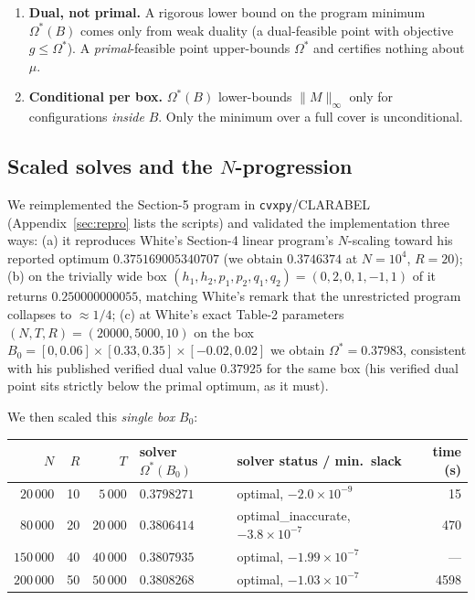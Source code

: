 \documentclass[11pt]{article}
\theoremstyle{remark}
\newcommand{\supnorm}[1]{\lVert #1 \rVert_\infty}
\begin{document}
\begin{enumerate}
\item[(L1)] \textbf{Dual, not primal.} A rigorous lower bound on the program
minimum $\Omega^\ast(B)$ comes only from weak duality (a dual-feasible point
with objective $g \le \Omega^\ast$). A \emph{primal}-feasible point
upper-bounds $\Omega^\ast$ and certifies nothing about $\mu$.
\item[(L2)] \textbf{Conditional per box.} $\Omega^\ast(B)$ lower-bounds
$\supnorm{M}$ only for configurations \emph{inside} $B$. Only the minimum
over a full cover is unconditional.
\end{enumerate}

\subsection{Scaled solves and the $N$-progression}\label{sec:scaling}

We reimplemented the Section-5 program in \texttt{cvxpy}/CLARABEL
(Appendix~\ref{sec:repro} lists the scripts) and validated the
implementation three ways: (a) it reproduces White's Section-4 linear
program's $N$-scaling toward his reported optimum $0.375169005340707$
(we obtain $0.3746374$ at $N = 10^4$, $R=20$); (b) on the trivially wide box
$(h_1,h_2,p_1,p_2,q_1,q_2)=(0,2,0,1,-1,1)$ of \cite[eq.~(5.15)]{White22} it
returns $0.250000000055$, matching White's remark that the unrestricted
program collapses to $\approx 1/4$; (c) at White's exact Table-2 parameters
$(N,T,R) = (20000, 5000, 10)$ on the box
$B_0 = [0, 0.06] \times [0.33, 0.35] \times [-0.02, 0.02]$ we obtain
$\Omega^\ast = 0.37983$, consistent with his published verified dual value
$0.37925$ for the same box (his verified dual point sits strictly below the
primal optimum, as it must).

We then scaled this \emph{single box} $B_0$:

\begin{center}
\begin{tabular}{@{}rrrllr@{}}
\toprule
$N$ & $R$ & $T$ & solver $\Omega^\ast(B_0)$ & solver status / min.\ slack & time (s)\\
\midrule
$20\,000$  & 10 & $5\,000$  & $0.3798271$ & optimal, $-2.0\times10^{-9}$ & 15 \\
$80\,000$  & 20 & $20\,000$ & $0.3806414$ & optimal\_inaccurate, $-3.8\times10^{-7}$ & 470 \\
$150\,000$ & 40 & $40\,000$ & $0.3807935$ & optimal, $-1.99\times10^{-7}$ & --- \\
$200\,000$ & 50 & $50\,000$ & $0.3808268$ & optimal, $-1.03\times10^{-7}$ & 4598 \\
\bottomrule
\end{tabular}
\end{center}
\end{document}
